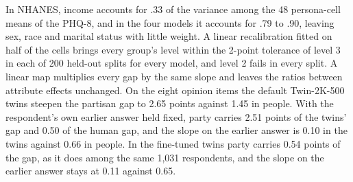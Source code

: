 In NHANES, income accounts for .33 of the variance among the 48 persona-cell means of the PHQ-8, and in the four models it accounts for .79 to .90, leaving sex, race and marital status with little weight.
A linear recalibration fitted on half of the cells brings every group's level within the 2-point tolerance of level 3 in each of 200 held-out splits for every model, and level 2 fails in every split.
A linear map multiplies every gap by the same slope and leaves the ratios between attribute effects unchanged.
On the eight opinion items the default Twin-2K-500 twins steepen the partisan gap to 2.65 points against 1.45 in people.
With the respondent's own earlier answer held fixed, party carries 2.51 points of the twins' gap and 0.50 of the human gap, and the slope on the earlier answer is 0.10 in the twins against 0.66 in people.
In the fine-tuned twins party carries 0.54 points of the gap, as it does among the same 1,031 respondents, and the slope on the earlier answer stays at 0.11 against 0.65.
